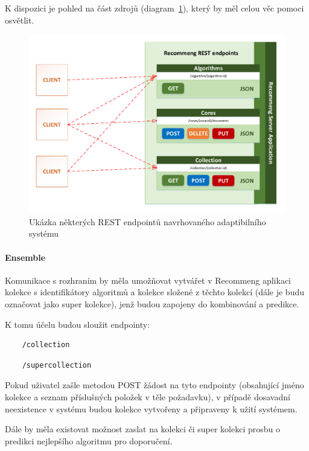 \documentclass[thesis=M,czech]{FITthesis}[2014/05/07]
\begin{document}
K dispozici je pohled na část zdrojů (diagram~\ref{fig:rest}), který by měl celou věc pomoci osvětlit. 

\begin{figure}\centering
	\includegraphics[width=1.0\textwidth]{obr/DIPLOMKA_rest.pdf}
 	\caption[Ukázka některých REST endpointů navrhovaného adaptibilního systému]{Ukázka některých REST endpointů navrhovaného adaptibilního systému}\label{fig:rest}
\end{figure}	

\paragraph{Ensemble}
Komunikace s rozhraním by měla umožňovat vytvářet v Recommeng aplikaci kolekce s identifikátory algoritmů a kolekce složené z těchto kolekcí (dále je budu označovat jako super kolekce), jenž budou zapojeny do kombinování a predikce. 

K tomu účelu budou sloužit endpointy:

\begin{verbatim}
	/collection
\end{verbatim}

\begin{verbatim}
	/supercollection
\end{verbatim}

Pokud uživatel zašle metodou POST žádost na tyto endpointy (obsahující jméno kolekce a seznam příslušných položek v těle požadavku), v případě dosavadní neexistence v systému budou kolekce vytvořeny a připraveny k užití systémem.

Dále by měla existovat možnost zaslat na kolekci či super kolekci prosbu o predikci nejlepšího algoritmu pro doporučení.
\end{document}
